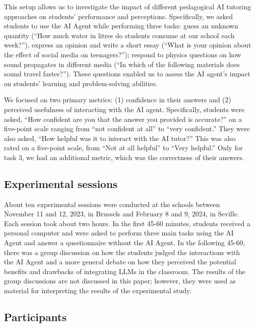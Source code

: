 \documentclass[
  12pt,
]{article}
\begin{document}
This setup allows us to investigate the impact of different pedagogical AI tutoring approaches on students' performance and perceptions. Specifically, we asked students to use the AI Agent while performing three tasks: guess an unknown quantity (``How much water in litres do students consume at our school each week?''), express an opinion and write a short essay (``What is your opinion about the effect of social media on teenagers?''); respond to physics questions on how sound propagates in different media (``In which of the following materials does sound travel faster?''). These questions enabled us to assess the AI agent's impact on students' learning and problem-solving abilities.

We focused on two primary metrics: (1) confidence in their answers and (2) perceived usefulness of interacting with the AI agent. Specifically, students were asked, ``How confident are you that the answer you provided is accurate?'' on a five-point scale ranging from ``not confident at all'' to ``very confident.'' They were also asked, ``How helpful was it to interact with the AI tutor?'' This was also rated on a five-point scale, from ``Not at all helpful'' to ``Very helpful.'' Only for task 3, we had an additional metric, which was the correctness of their answers.

\subsection{Experimental sessions}\label{experimental-sessions}

About ten experimental sessions were conducted at the schools between November 11 and 12, 2023, in Brussels and February 8 and 9, 2024, in Seville. Each session took about two hours. In the first 45-60 minutes, students received a personal computer and were asked to perform three main tasks using the AI Agent and answer a questionnaire without the AI Agent. In the following 45-60, there was a group discussion on how the students judged the interactions with the AI Agent and a more general debate on how they perceived the potential benefits and drawbacks of integrating LLMs in the classroom. The results of the group discussions are not discussed in this paper; however, they were used as material for interpreting the results of the experimental study.

\subsection{Participants}\label{participants}
\end{document}
